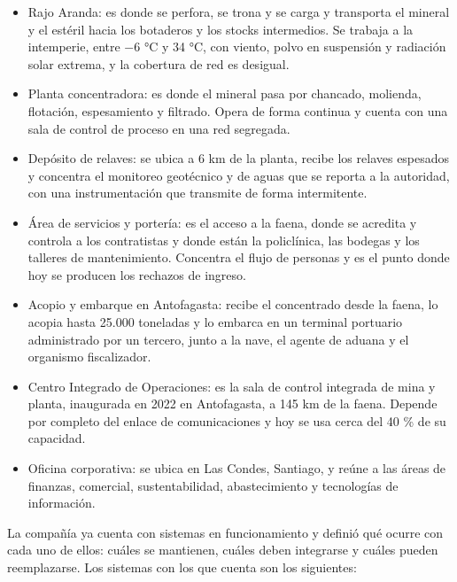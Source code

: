 \documentclass[anexo]{../../comun/overfore}
\begin{document}
\begin{itemize}
\item Rajo Aranda: es donde se perfora, se trona y se carga y transporta el mineral y el estéril hacia los botaderos y los stocks intermedios. Se trabaja a la intemperie, entre −6 °C y 34 °C, con viento, polvo en suspensión y radiación solar extrema, y la cobertura de red es desigual.
\item Planta concentradora: es donde el mineral pasa por chancado, molienda, flotación, espesamiento y filtrado. Opera de forma continua y cuenta con una sala de control de proceso en una red segregada.
\item Depósito de relaves: se ubica a 6 km de la planta, recibe los relaves espesados y concentra el monitoreo geotécnico y de aguas que se reporta a la autoridad, con una instrumentación que transmite de forma intermitente.
\item Área de servicios y portería: es el acceso a la faena, donde se acredita y controla a los contratistas y donde están la policlínica, las bodegas y los talleres de mantenimiento. Concentra el flujo de personas y es el punto donde hoy se producen los rechazos de ingreso.
\item Acopio y embarque en Antofagasta: recibe el concentrado desde la faena, lo acopia hasta 25.000 toneladas y lo embarca en un terminal portuario administrado por un tercero, junto a la nave, el agente de aduana y el organismo fiscalizador.
\item Centro Integrado de Operaciones: es la sala de control integrada de mina y planta, inaugurada en 2022 en Antofagasta, a 145 km de la faena. Depende por completo del enlace de comunicaciones y hoy se usa cerca del 40 \% de su capacidad.
\item Oficina corporativa: se ubica en Las Condes, Santiago, y reúne a las áreas de finanzas, comercial, sustentabilidad, abastecimiento y tecnologías de información.
\end{itemize}

La compañía ya cuenta con sistemas en funcionamiento y definió qué ocurre con cada uno de ellos: cuáles se mantienen, cuáles deben integrarse y cuáles pueden reemplazarse. Los sistemas con los que cuenta son los siguientes:
\end{document}
